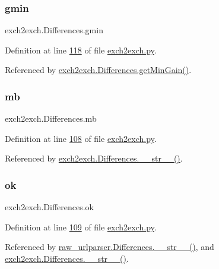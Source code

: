 \subsubsection{\texorpdfstring{gmin}{gmin}}
{\footnotesize\ttfamily exch2exch.\+Differences.\+gmin}



Definition at line \hyperlink{exch2exch_8py_source_l00118}{118} of file \hyperlink{exch2exch_8py_source}{exch2exch.\+py}.



Referenced by \hyperlink{exch2exch_8py_source_l00133}{exch2exch.\+Differences.\+get\+Min\+Gain()}.

\mbox{\label{classexch2exch_1_1_differences_a81c81e9c15b5ea8a5d39bb99d85250e1}} 
\subsubsection{\texorpdfstring{mb}{mb}}
{\footnotesize\ttfamily exch2exch.\+Differences.\+mb}



Definition at line \hyperlink{exch2exch_8py_source_l00108}{108} of file \hyperlink{exch2exch_8py_source}{exch2exch.\+py}.



Referenced by \hyperlink{exch2exch_8py_source_l00154}{exch2exch.\+Differences.\+\_\+\+\_\+str\+\_\+\+\_\+()}.

\mbox{\label{classexch2exch_1_1_differences_a6de3ee563584c83a97ba815db8ec7831}} 
\subsubsection{\texorpdfstring{ok}{ok}}
{\footnotesize\ttfamily exch2exch.\+Differences.\+ok}



Definition at line \hyperlink{exch2exch_8py_source_l00109}{109} of file \hyperlink{exch2exch_8py_source}{exch2exch.\+py}.



Referenced by \hyperlink{raw__urlparser_8py_source_l00100}{raw\+\_\+urlparser.\+Differences.\+\_\+\+\_\+str\+\_\+\+\_\+()}, and \hyperlink{exch2exch_8py_source_l00154}{exch2exch.\+Differences.\+\_\+\+\_\+str\+\_\+\+\_\+()}.

